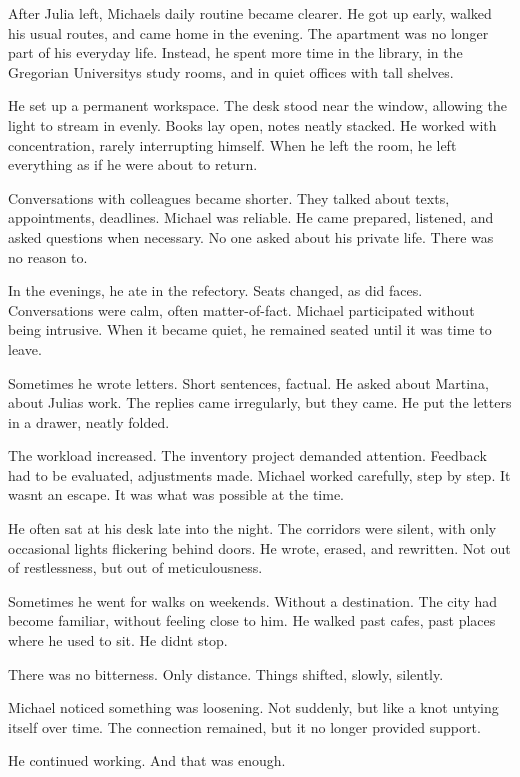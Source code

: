 \documentclass[
]{article}
\begin{document}
After Julia left, Michael\textquotesingle s daily routine became clearer. He got up early, walked his usual routes, and came home in the evening. The apartment was no longer part of his everyday life. Instead, he spent more time in the library, in the Gregorian University\textquotesingle s study rooms, and in quiet offices with tall shelves.

He set up a permanent workspace. The desk stood near the window, allowing the light to stream in evenly. Books lay open, notes neatly stacked. He worked with concentration, rarely interrupting himself. When he left the room, he left everything as if he were about to return.

Conversations with colleagues became shorter. They talked about texts, appointments, deadlines. Michael was reliable. He came prepared, listened, and asked questions when necessary. No one asked about his private life. There was no reason to.

In the evenings, he ate in the refectory. Seats changed, as did faces. Conversations were calm, often matter-of-fact. Michael participated without being intrusive. When it became quiet, he remained seated until it was time to leave.

Sometimes he wrote letters. Short sentences, factual. He asked about Martina, about Julia\textquotesingle s work. The replies came irregularly, but they came. He put the letters in a drawer, neatly folded.

The workload increased. The inventory project demanded attention. Feedback had to be evaluated, adjustments made. Michael worked carefully, step by step. It wasn\textquotesingle t an escape. It was what was possible at the time.

He often sat at his desk late into the night. The corridors were silent, with only occasional lights flickering behind doors. He wrote, erased, and rewritten. Not out of restlessness, but out of meticulousness.

Sometimes he went for walks on weekends. Without a destination. The city had become familiar, without feeling close to him. He walked past cafes, past places where he used to sit. He didn\textquotesingle t stop.

There was no bitterness. Only distance. Things shifted, slowly, silently.

Michael noticed something was loosening. Not suddenly, but like a knot untying itself over time. The connection remained, but it no longer provided support.

He continued working. And that was enough.
\end{document}
